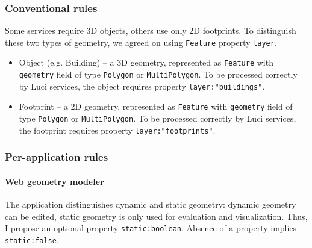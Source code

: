 \subsubsection{Conventional rules}
\label{sec:services:convenru}

Some services require 3D objects, others use only 2D footprints.
To distinguish these two types of geometry, we agreed on using \texttt{Feature} property \texttt{layer}.
\begin{itemize}
\item Object (e.g. Building) -- a 3D geometry, represented as \texttt{Feature} with \texttt{geometry} field of type \texttt{Polygon} or \texttt{MultiPolygon}.
To be processed correctly by \ac{Luci} services, the object requires property \texttt{layer:\color{red}"buildings"}.
%
\item Footprint -- a 2D geometry, represented as \texttt{Feature} with \texttt{geometry}
field of type \texttt{Polygon} or \texttt{MultiPolygon}.
To be processed correctly by \ac{Luci} services, the footprint requires property \texttt{layer:\color{red}"footprints"}.
\end{itemize}


\subsubsection{Per-application rules}
\label{sec:services:appru}

\paragraph{Web geometry modeler}
The application distinguishes dynamic and static geometry:
dynamic geometry can be edited, static geometry is only used for evaluation and visualization.
Thus, I propose an optional property \texttt{static:\color{blue}boolean}.
Absence of a property implies \texttt{static:\color{brown}false}.

\clearpage
